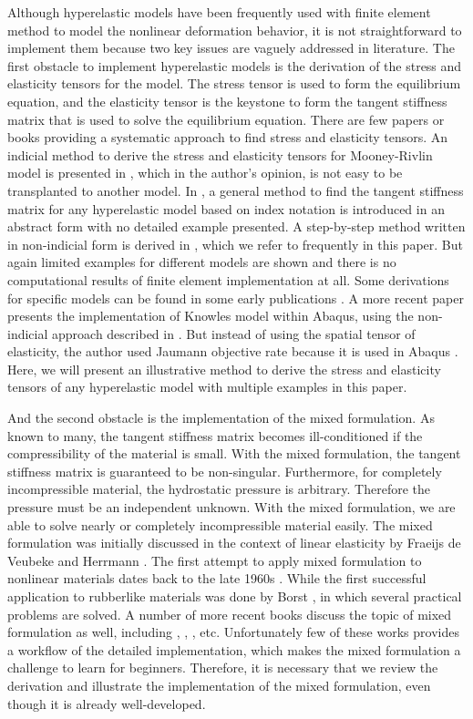 Although hyperelastic models have been frequently used with finite element method to model the nonlinear deformation behavior, it is not straightforward to implement them because two key issues are vaguely addressed in literature. The first obstacle to implement hyperelastic models is the derivation of the stress and elasticity tensors for the model. The stress tensor is used to form the equilibrium equation, and the elasticity tensor is the keystone to form the tangent stiffness matrix that is used to solve the equilibrium equation. There are few papers or books providing a systematic approach to find stress and elasticity tensors. An indicial method to derive the stress and elasticity tensors for Mooney-Rivlin model is presented in \cite{Bower}, which in the author's opinion, is not easy to be transplanted to another model. In \cite{Belytschko}, a general method to find the tangent stiffness matrix for any hyperelastic model based on index notation is introduced in an abstract form with no detailed example presented. A step-by-step method written in non-indicial form is derived in \cite{Holzapfel}, which we refer to frequently in this paper. But again limited examples for different models are shown and there is no computational results of finite element implementation at all. Some derivations for specific models can be found in some early publications \cite{Weiss, Nicholson}. A more recent paper \cite{Suchocki} presents the implementation of Knowles model within Abaqus, using the non-indicial approach described in \cite{Holzapfel}. But instead of using the spatial tensor of elasticity, the author used Jaumann objective rate because it is used in Abaqus \cite{Abaqus}. Here, we will present an illustrative method to derive the stress and elasticity tensors of any hyperelastic model with multiple examples in this paper.


And the second obstacle is the implementation of the mixed formulation. As known to many, the tangent stiffness matrix becomes ill-conditioned if the compressibility of the material is small. With the mixed formulation, the tangent stiffness matrix is guaranteed to be non-singular. Furthermore, for completely incompressible material, the hydrostatic pressure is arbitrary. Therefore the pressure must be an independent unknown. With the mixed formulation, we are able to solve nearly or completely incompressible material easily. 
The mixed formulation was initially discussed in the context of linear elasticity by Fraeijs de Veubeke \cite{Veubeke} and Herrmann \cite{Herrmann}. The first attempt to apply mixed formulation to nonlinear materials dates back to the late 1960s \cite{Oden}. While the first successful application to rubberlike materials was done by Borst \cite{Borst}, in which several practical problems are solved. A number of more recent books discuss the topic of mixed formulation as well, including \cite{Bathe}, \cite{Holzapfel}, \cite{Zienkiewicz}, etc. Unfortunately few of these works provides a workflow of the detailed implementation, which makes the mixed formulation a challenge to learn for beginners. Therefore, it is necessary that we review the derivation and illustrate the implementation of the mixed formulation, even though it is already well-developed.

